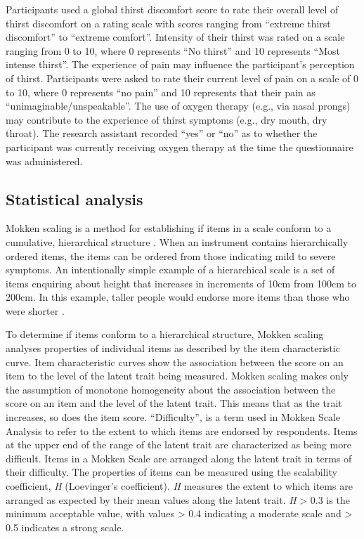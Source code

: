\documentclass[12pt,twocolumn,twoside,]{pinp}
\begin{document}
Participants used a global thirst discomfort score to rate their overall
level of thirst discomfort on a rating scale with scores ranging from
``extreme thirst discomfort'' to ``extreme comfort''. Intensity of their
thirst was rated on a scale ranging from 0 to 10, where 0 represents
``No thirst'' and 10 represents ``Most intense thirst''. The experience
of pain may influence the participant's perception of
thirst.\citep{Pierotti_2018} Participants were asked to rate their
current level of pain on a scale of 0 to 10, where 0 represents ``no
pain'' and 10 represents that their pain as
``unimaginable/unspeakable''. The use of oxygen therapy (e.g., via nasal
prongs) may contribute to the experience of thirst symptoms (e.g., dry
mouth, dry throat).\citep{conchon2015perioperative} The research
assistant recorded ``yes'' or ``no'' as to whether the participant was
currently receiving oxygen therapy at the time the questionnaire was
administered.

\hypertarget{statistical-analysis}{%
\subsection{Statistical analysis}\label{statistical-analysis}}

Mokken scaling is a method for establishing if items in a scale conform
to a cumulative, hierarchical structure \citep{perng2012construct}. When
an instrument contains hierarchically ordered items, the items can be
ordered from those indicating mild to severe symptoms. An intentionally
simple example of a hierarchical scale is a set of items enquiring about
height that increases in increments of 10cm from 100cm to 200cm. In this
example, taller people would endorse more items than those who were
shorter \citep{watson2008hierarchy}.

To determine if items conform to a hierarchical structure, Mokken
scaling analyses properties of individual items as described by the item
characteristic curve. Item characteristic curves show the association
between the score on an item to the level of the latent trait being
measured. Mokken scaling makes only the assumption of monotone
homogeneity about the association between the score on an item and the
level of the latent trait. This means that as the trait increases, so
does the item score. ``Difficulty'', is a term used in Mokken Scale
Analysis to refer to the extent to which items are endorsed by
respondents. Items at the upper end of the range of the latent trait are
characterized as being more difficult. Items in a Mokken Scale are
arranged along the latent trait in terms of their difficulty. The
properties of items can be measured using the scalability coefficient,
\emph{H} (Loevinger's coefficient). \emph{H} measures the extent to
which items are arranged as expected by their mean values along the
latent trait. \emph{H} \textgreater{} 0.3 is the minimum acceptable
value, with values \textgreater{} 0.4 indicating a moderate scale and
\textgreater{} 0.5 indicates a strong scale.
\end{document}
